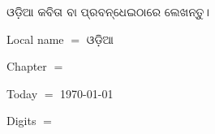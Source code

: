 \documentclass{article}
\begin{document}
ଓଡ଼ିଆ କବିତା ବା ପ୍ରବନ୍ଧେଇଠାରେ ଲେଖନ୍ତୁ।

Local name $=$ ଓଡ଼ିଆ

Chapter $=$ \chaptername

Today $=$ \today

Digits $=$ 
\end{document}
